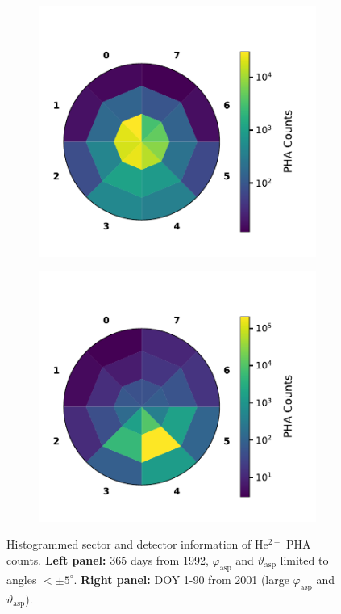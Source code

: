 \begin{figure}
	\centering
	\begin{subfigure}{.5\textwidth}
		\centering
		\includegraphics[width=1\textwidth]{Figures/hist_sec_det_noaa.pdf}
	\end{subfigure}%
	\begin{subfigure}{.5\textwidth}
		\centering
		\includegraphics[width=1\textwidth]{Figures/hist_sec_det_aa.pdf}
	\end{subfigure}
	\caption{Histogrammed sector and detector information of $\mathrm{He^{2+}}$ PHA counts. \textbf{Left panel:} 365 days from 1992, $\varphi_{\mathrm{asp}}$ and $\vartheta_{\mathrm{asp}}$ limited to angles $<\pm5^\circ$. \textbf{Right panel:} DOY 1-90 from 2001  (large $\varphi_{\mathrm{asp}}$ and $\vartheta_{\mathrm{asp}}$).}
\label{fig:histdetsecaa}
\end{figure}
%
%
